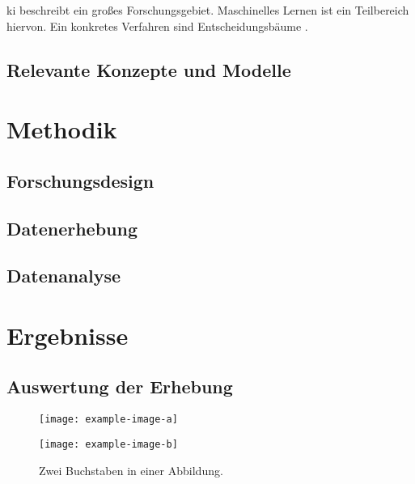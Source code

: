 \documentclass[twoside=false,DIV=8]{scrbook}
\begin{document}
\Gls{ki} beschreibt ein großes Forschungsgebiet. Maschinelles Lernen ist ein Teilbereich hiervon. Ein konkretes Verfahren sind Entscheidungsbäume \autocite{knuth_2021}.

\lipsum[1-2]

\section{Relevante Konzepte und Modelle}

\lipsum[3-5]

\chapter{Methodik}

\section{Forschungsdesign}

\lipsum[1-2]

\section{Datenerhebung}

\lipsum[3-4]

\section{Datenanalyse}

\lipsum[5-6]

\chapter{Ergebnisse}

\section{Auswertung der Erhebung}

\lipsum[1-3]

\begin{figure}[t]
  \begin{minipage}{\linewidth}
    \begin{minipage}{0.5\linewidth}
      \centering
      \texttt{[image: example-image-a]}
    \end{minipage}%
    \begin{minipage}{0.5\linewidth}
      \centering
      \texttt{[image: example-image-b]}
    \end{minipage}
    \caption{Zwei Buchstaben in einer Abbildung.}
  \end{minipage}
\end{figure}
\end{document}
